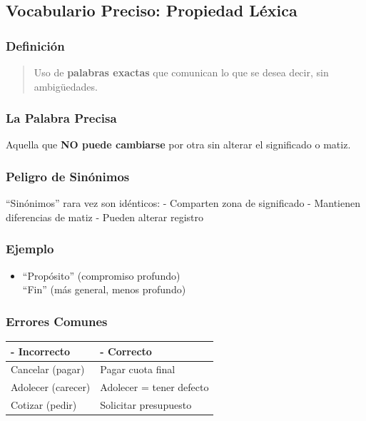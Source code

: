 \documentclass[
  11pt,
]{beaner}
\providecommand{\tightlist}{%
  \setlength{\itemsep}{0pt}\setlength{\parskip}{0pt}}
\begin{document}
\subsection{Vocabulario Preciso: Propiedad
Léxica}\label{vocabulario-preciso-propiedad-luxe9xica}

\subsubsection{Definición}\label{definiciuxf3n-3}

\begin{quote}
Uso de \textbf{palabras exactas} que comunican lo que se desea decir,
sin ambigüedades.
\end{quote}

\subsubsection{La Palabra Precisa}\label{la-palabra-precisa}

Aquella que \textbf{NO puede cambiarse} por otra sin alterar el
significado o matiz.

\subsubsection{Peligro de Sinónimos}\label{peligro-de-sinuxf3nimos}

``Sinónimos'' rara vez son idénticos: - Comparten zona de significado -
Mantienen diferencias de matiz - Pueden alterar registro

\subsubsection{Ejemplo}\label{ejemplo-1}

\begin{itemize}
\tightlist
\item
  ``Propósito'' (compromiso profundo)\\
  ``Fin'' (más general, menos profundo)
\end{itemize}

\subsubsection{Errores Comunes}\label{errores-comunes-4}

\begin{longtable}[]{@{}ll@{}}
\toprule\noalign{}
- Incorrecto & - Correcto \\
\midrule\noalign{}
\endhead
\bottomrule\noalign{}
\endlastfoot
Cancelar (pagar) & Pagar cuota final \\
Adolecer (carecer) & Adolecer = tener defecto \\
Cotizar (pedir) & Solicitar presupuesto \\
\end{longtable}
\end{document}
